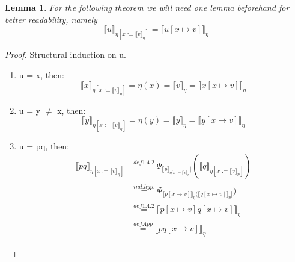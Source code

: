 \documentclass{article}
\newtheorem{lemma}[theorem]{Lemma} %
\begin{document}
	\begin{lemma}
		For the following theorem we will need one lemma
		beforehand for better readability, namely
		\begin{equation}
			\llbracket u \rrbracket_{\eta [x := 
				\llbracket v \rrbracket_{\eta}]} = 
				\llbracket u [x \mapsto v] \rrbracket_{\eta}
		\end{equation}
	\end{lemma}
	\begin{proof}
		Structural induction on u.
		\begin{enumerate}
			\item u = x, then:
			\begin{equation}
				\llbracket x \rrbracket_{\eta [x := 
				\llbracket v \rrbracket_{\eta}]} = 
				\eta (x) =
				\llbracket v \rrbracket_{\eta} =
				\llbracket x [x \mapsto v] \rrbracket_{\eta}
			\end{equation}
			
			\item u = y $\neq$ x, then:
			\begin{equation}
				\llbracket y \rrbracket_{\eta [x := 
				\llbracket v \rrbracket_{\eta}]} = 
				\eta (y) =
				\llbracket y \rrbracket_{\eta} =
				\llbracket y [x \mapsto v] \rrbracket_{\eta}
			\end{equation}

			\item u = pq, then:
			\begin{equation*}
			\begin{split}
				\llbracket pq \rrbracket_{\eta [x := 
				\llbracket v \rrbracket_{\eta}]}
 				&\stackrel{def 1.4.2}{=}
				\Psi_{\llbracket p \rrbracket_{
					\eta [x := \llbracket v \rrbracket_{\eta}}]}
					(\llbracket q \rrbracket_{
					\eta [x:= \llbracket v \rrbracket_{\eta}]}) \\
 				&\stackrel{ind.hyp.}{=}
				\Psi_{\llbracket p[x \mapsto v] \rrbracket_{\eta}
					(\llbracket q[x \mapsto v] \rrbracket_{\eta}]}) \\
 				&\stackrel{def 1.4.2}{=}
				\llbracket p[x \mapsto v]q[x \mapsto v] 
					\rrbracket_{\eta}\\
 				&\stackrel{def App}{=}
				\llbracket pq [x \mapsto v] \rrbracket_{\eta}
			\end{split}
			\end{equation*}


\end{enumerate}
\end{proof}
\end{document}
